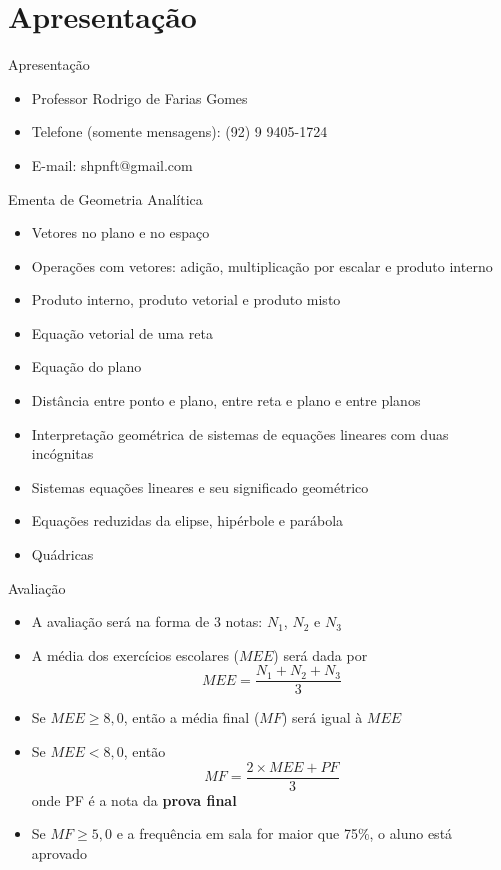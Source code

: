 \section{Apresentação}

\begin{frame} %
    \titlepage
\end{frame}

\begin{frame}[c]{Apresentação}
    \begin{itemize}
        \item Professor Rodrigo de Farias Gomes
        \item Telefone (somente mensagens): (92) 9 9405-1724
        \item E-mail: shpnft@gmail.com
    \end{itemize}
\end{frame}

\begin{frame}{Ementa de Geometria Analítica}
    \begin{itemize}
        \item Vetores no plano e no espaço
        \item Operações com vetores: adição, multiplicação por escalar e produto interno
        \item Produto interno, produto vetorial e produto misto
        \item Equação vetorial de uma reta
        \item Equação do plano
        \item Distância entre ponto e plano, entre reta e plano e entre planos
        \item Interpretação geométrica de sistemas de equações lineares com duas incógnitas
        \item Sistemas equações lineares e seu significado geométrico
        \item Equações reduzidas da elipse, hipérbole e parábola
        \item Quádricas
    \end{itemize}
\end{frame}

\begin{frame}{Avaliação}
    \begin{itemize}
        \item A avaliação será na forma de 3 notas: \(N_1\), \(N_2\) e \(N_3\)
        \item A média dos exercícios escolares (\(MEE\)) será dada por
            \[
                MEE=\frac{N_1+N_2+N_3}{3}
            \]
        \item Se \(MEE \geq 8,0\), então a média final (\(MF\)) será igual à \(MEE\)
        \item Se \(MEE < 8,0\), então
            \[
                MF=\frac{2\times MEE+PF}{3}
            \]
            onde PF é a nota da \textbf{prova final}
        \item Se \(MF \geq 5,0\) e a frequência em sala for maior que 75\%, o aluno está aprovado
    \end{itemize}
\end{frame}

